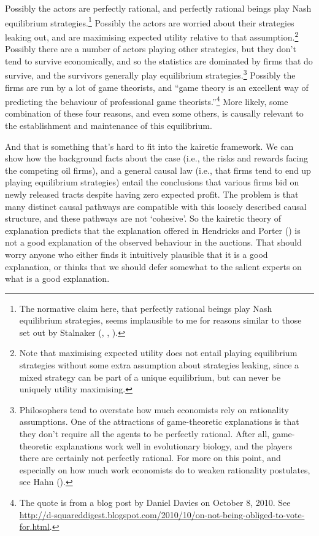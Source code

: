 \documentclass[
  10pt,
  letterpaper,
  DIV=11,
  numbers=noendperiod,
  twoside]{scrartcl}
\begin{document}
Possibly the actors are perfectly rational, and perfectly rational
beings play Nash equilibrium strategies.\footnote{The normative claim
  here, that perfectly rational beings play Nash equilibrium strategies,
  seems implausible to me for reasons similar to those set out by
  Stalnaker (,
  ,
  ).} Possibly the actors are worried
about their strategies leaking out, and are maximising expected utility
relative to that assumption.\footnote{Note that maximising expected
  utility does not entail playing equilibrium strategies without some
  extra assumption about strategies leaking, since a mixed strategy can
  be part of a unique equilibrium, but can never be uniquely utility
  maximising.} Possibly there are a number of actors playing other
strategies, but they don't tend to survive economically, and so the
statistics are dominated by firms that do survive, and the survivors
generally play equilibrium strategies.\footnote{Philosophers tend to
  overstate how much economists rely on rationality assumptions. One of
  the attractions of game-theoretic explanations is that they don't
  require all the agents to be perfectly rational. After all,
  game-theoretic explanations work well in evolutionary biology, and the
  players there are certainly not perfectly rational. For more on this
  point, and especially on how much work economists do to weaken
  rationality postulates, see Hahn ().}
Possibly the firms are run by a lot of game theorists, and ``game theory
is an excellent way of predicting the behaviour of professional game
theorists.''\footnote{The quote is from a blog post by Daniel Davies on
  October 8, 2010. See
  \url{http://d-squareddigest.blogspot.com/2010/10/on-not-being-obliged-to-vote-for.html}.}
More likely, some combination of these four reasons, and even some
others, is causally relevant to the establishment and maintenance of
this equilibrium.

And that is something that's hard to fit into the kairetic framework. We
can show how the background facts about the case (i.e., the risks and
rewards facing the competing oil firms), and a general causal law (i.e.,
that firms tend to end up playing equilibrium strategies) entail the
conclusions that various firms bid on newly released tracts despite
having zero expected profit. The problem is that many distinct causal
pathways are compatible with this loosely described causal structure,
and these pathways are not `cohesive'. So the kairetic theory of
explanation predicts that the explanation offered in Hendricks and
Porter () is not a good
explanation of the observed behaviour in the auctions. That should worry
anyone who either finds it intuitively plausible that it is a good
explanation, or thinks that we should defer somewhat to the salient
experts on what is a good explanation.
\end{document}
